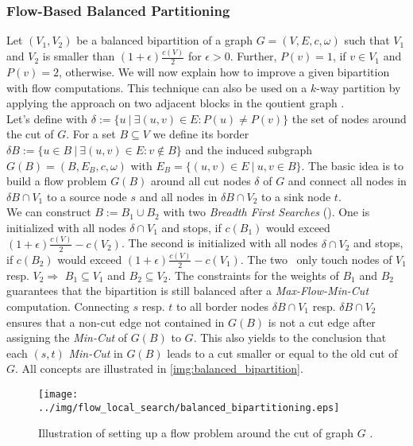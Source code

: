 \subsubsection{Flow-Based Balanced Partitioning}
\label{sec:balanced_bipartitioning}
Let $(V_1,V_2)$ be a balanced bipartition of a graph $G = (V,E,c,\omega)$ such that $V_1$ and
$V_2$ is smaller than $(1+\epsilon)\frac{c(V)}{2}$ for $\epsilon > 0$. Further, $P(v) = 1$, if $v \in V_1$ and
$P(v) = 2$, otherwise. We will now explain how to improve a given
bipartition with flow computations. This technique can also be used on a $k$-way 
partition by applying the approach on two adjacent blocks in the qoutient graph \cite{sanders2011engineering}. \\
Let's define with $\delta := \{ u\ |\ \exists (u,v) \in E: P(u) \neq P(v) \}$ the set of nodes
around the cut of $G$. For a set $B \subseteq V$ we define its border 
$\delta B := \{u \in B\ |\ \exists (u,v) \in E: v \notin B\}$ and the induced subgraph
$G(B) = (B,E_B,c,\omega)$ with $E_B = \{(u,v) \in E\ |\ u, v \in B\}$. 
The basic idea is to build a flow problem $G(B)$ around all cut nodes $\delta$ of 
$G$ and connect all nodes in $\delta B \cap V_1$ to a source node $s$ and all nodes in 
$\delta B \cap V_2$ to a sink node $t$. \\
We can construct $B := B_1 \cup B_2$ with two \emph{Breadth First Searches} (\BFS). 
One is initialized with all nodes $\delta \cap V_1$ and stops, if $c(B_1)$ would 
exceed $(1+\epsilon)\frac{c(V)}{2} - c(V_2)$. The second is initialized with 
all nodes $\delta \cap V_2$ and stops, if $c(B_2)$ would exceed 
$(1+\epsilon)\frac{c(V)}{2} - c(V_1)$. The two \BFS~only touch nodes of $V_1$ resp. $V_2 \Rightarrow$
$B_1 \subseteq V_1$ and $B_2 \subseteq V_2$. The constraints for the weights of $B_1$
and $B_2$ guarantees that the bipartition is still balanced after a \emph{Max-Flow-Min-Cut}
computation. Connecting $s$ resp. $t$ to all border nodes $\delta B \cap V_1$ resp.
$\delta B \cap V_2$ ensures that a non-cut edge not contained in $G(B)$ is not a cut edge after
assigning the \emph{Min-Cut} of $G(B)$ to $G$. This also yields to the conclusion that each
$(s,t)$ \emph{Min-Cut} in $G(B)$ leads to a cut smaller or equal to the old cut of $G$. All
concepts are illustrated in \autoref{img:balanced_bipartition}.

\begin{figure}
\centering
\texttt{[image: ../img/flow\_local\_search/balanced\_bipartitioning.eps]}
\caption{Illustration of setting up a flow problem around the cut of graph $G$ \cite{andersen2008algorithm}.}
\label{img:balanced_bipartition}
\end{figure}

